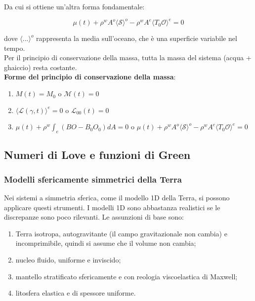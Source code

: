 \documentclass[a4paper,12pt]{book}
\begin{document}
\noindent Da cui si ottiene un'altra forma fondamentale:

\begin{equation}
    \mu(t) + \rho^w A^o \langle\mathcal{S}\rangle^o - \rho^wA^e \langle T_0 \mathcal{O}\rangle^e = 0
    \label{eq:MCP3}
\end{equation}

\noindent
dove $\langle...\rangle^o$ rappresenta la media sull'oceano, che è una superficie variabile nel tempo.\\

\noindent
Per il principio di conservazione della massa, tutta la massa del sistema (acqua + ghaiccio) resta costante.\\

\noindent \textbf{\textcolor{colore7}{Forme del principio di conservazione della massa}}:

\begin{enumerate}
    \item $M(t) = M_0$ o $\mathcal{M}(t) = 0$
    \item $\langle\mathcal{L}(\gamma, t)\rangle^e = 0$ o $\mathcal{L}_{00} (t) = 0$
    \item $\mu(t) + \rho^w \int_e (BO - B_0O_0)dA = 0$ o $\mu(t) + \rho^w A^o \langle\mathcal{S}\rangle^o - \rho^w A^e\langle T_0 \mathcal{O}\rangle^e = 0$
\end{enumerate}

\subsection{\textcolor{colore7}{Numeri di Love e funzioni di Green}}

\subsubsection{\textcolor{colore7}{Modelli sfericamente simmetrici della Terra}}

Nei sistemi a simmetria sferica, come il modello 1D della Terra, si possono applicare questi strumenti.
I modelli 1D sono abbastanza realistici se le discrepanze sono poco rilevanti.
Le assunzioni di base sono:

\begin{enumerate}
    \item Terra isotropa, autogravitante (il campo gravitazionale non cambia) e incomprimibile, quindi si assume che il volume non cambia;
    \item nucleo fluido, uniforme e inviscido;
    \item mantello stratificato sfericamente e con reologia viscoelastica di Maxwell;
    \item litosfera elastica e di spessore uniforme.
\end{enumerate}
\end{document}
